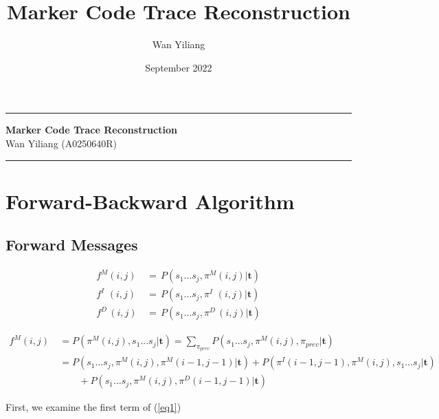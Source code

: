 \documentclass[10pt]{article}
\title{Marker Code Trace Reconstruction}
\author{Wan Yiliang}
\date{September 2022}
\begin{document}
\begin{center}
\hrule
\vspace{.4cm}
{\bf {\Huge Marker Code Trace Reconstruction}}
\vspace{.2cm} \\
Wan Yiliang  (A0250640R) 
\end{center}
\vspace{.1cm}
\hrule

\section{Forward-Backward Algorithm}

  \subsection{Forward Messages}

    \begin{equation}
    \begin{aligned}
      f^{M}(i, j) \,&=\, P(s_1...s_j, \pi^M(i, j) | \mathbf{t}) \\
      f^{I}\,\,(i, j) \,&=\, P(s_1...s_j, \pi^I\,\,(i, j) | \mathbf{t}) \\
      f^{D}\,(i, j) \,&=\, P(s_1...s_j, \pi^D\,(i, j) | \mathbf{t})
    \end{aligned}
    \end{equation}

    \begin{equation} \label{eq1}
    \begin{aligned}
      f^{M}(i, j) \
        &= P(\pi^M(i, j), s_1...s_j | \mathbf{t}) = \sum\nolimits_{\pi_{prev}} P(s_1...s_j, \pi^M(i, j), \pi_{prev} | \mathbf{t}) \\
        &= P(s_1...s_j, \pi^M(i, j), \pi^M(i-1, j-1) | \mathbf{t}) + P(\pi^I(i-1, j-1), \pi^M(i, j), s_1...s_j | \mathbf{t})  \\
        &\qquad + P(s_1...s_j, \pi^M(i, j), \pi^D(i-1, j-1) | \mathbf{t})
    \end{aligned}
    \end{equation}

    First, we examine the first term of (\ref{eq1})
\end{document}
